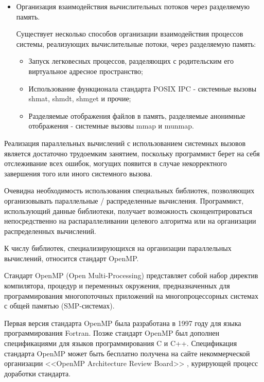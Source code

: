 \begin{itemize}
	\item Организация взаимодействия вычислительных потоков через разделяемую память.

	Существует несколько способов организации взаимодействия процессов системы, реализующих вычислительные потоки, через разделяемую память:

	\begin{itemize}

		\item Запуск легковесных процессов, разделяющих с родительским его виртуальное адресное пространство;
		\item Использование функционала стандарта POSIX IPC - системные вызовы shmat, shmdt, shmget и прочие;
		\item Разделяемые отображения файлов в память, разделяемые анонимные отображения - системные вызовы mmap и munmap.

	\end{itemize}

\end{itemize}

Реализация параллельных вычислений с использованием системных вызовов \linebreak \gl является достаточно трудоемким занятием, поскольку программист берет на себя отслеживание всех ошибок, могущих появится в случае некорректного завершения того или иного системного вызова.

Очевидна необходимость использования специальных библиотек, позволяющих организовывать параллельные / распределенные вычисления. Программист, использующий данные библиотеки, получает возможность сконцентрироваться непосредственно на распараллеливании целевого алгоритма или на организации распределенных вычислений.

К числу библиотек, специализирующихся на организации параллельных вычислений, относится стандарт OpenMP.


Стандарт OpenMP (Open Multi-Processing) представляет собой набор директив компилятора, процедур и переменных окружения, предназначенных для программирования многопоточных приложений на многопроцессорных системах с общей памятью (SMP-системах).

Первая версия стандарта OpenMP была разработана в 1997 году для языка программирования Fortran. Позже стандарт OpenMP был дополнен спецификациями для языков программирования C и C++. Спецификация стандарта OpenMP может быть бесплатно получена на сайте некоммерческой организации <<OpenMP Architecture Review Board>> \cite{openmp}, курирующей процесс доработки стандарта.

